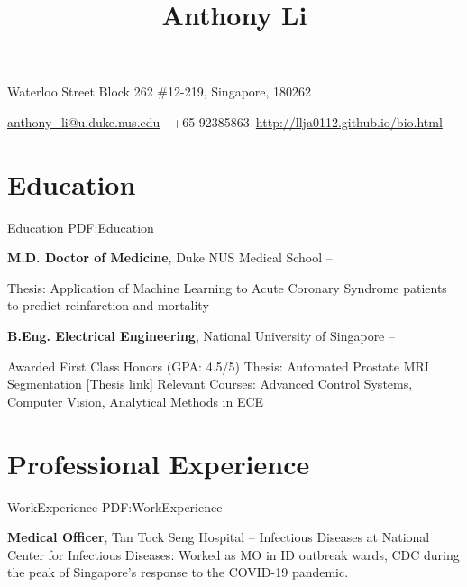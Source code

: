 \documentclass[letterpaper,10pt,oneside]{article}
\newcommand{\CVAuthor}{Anthony Li}
\newcommand{\CVWebpage}{http://llja0112.github.io/bio.html}
\begin{document}

\title{\CVAuthor}

\begin{subtitle}
{Waterloo Street Block 262 \#12-219, Singapore, 180262}
\par
\href{mailto:anthony_li@u.duke.nus.edu}
{anthony\_li@u.duke.nus.edu}
\,\SubBulletSymbol\,
+65 92385863\,
\href{\CVWebpage}
{\CVWebpage}
\end{subtitle}

\begin{body}


\section
{Education}
{Education}
{PDF:Education}

{\textbf{M.D. Doctor of Medicine}, Duke NUS Medical School}
\hfill
{} -- 

\GapNoBreak
\BulletItem
Thesis: Application of Machine Learning to Acute Coronary Syndrome patients to predict 
\newline reinfarction and mortality

\BigGap
{\textbf{B.Eng. Electrical Engineering}, National University of Singapore}
\hfill
{} --

\GapNoBreak
\BulletItem
Awarded First Class Honors (GPA: 4.5/5)
\BulletItem
Thesis: Automated Prostate MRI Segmentation [\href{https://drive.google.com/open?id=0B1GfPKwMcZtpdWp0aUpxMnlKbU1oLVJFbjN3bGwwcXZlVVNJ}{Thesis link}]
\BulletItem
Relevant Courses: Advanced Control Systems, Computer Vision, Analytical Methods in ECE

\section
{Professional Experience}
{WorkExperience}
{PDF:WorkExperience}

{\textbf{Medical Officer}, Tan Tock Seng Hospital}
\hfill
{} --
\BulletItem
Infectious Diseases at National Center for Infectious Diseases: Worked as MO in ID outbreak wards, CDC during the peak of Singapore's response to the COVID-19 pandemic.


\end{body}
\end{document}
